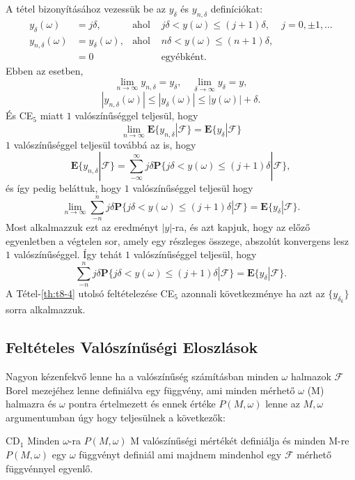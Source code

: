 \documentclass{article}
\begin{document}
A tétel bizonyításához vezessük be az $y_{\delta}$ és $y_{n,\delta}$ definíciókat:
\begin{align*}
    y_{\delta}(\omega) &= j \delta, & \text{ahol } & j \delta < y(\omega) \le (j+1)\delta, & j=0,\pm 1, \ldots \\
    y_{n,\delta}(\omega) &= y_{\delta}(\omega), & \text{ahol } & n \delta < y(\omega) \le (n+1)\delta, \\
	&= 0 && \text{egyébként}.
\end{align*}
Ebben az esetben,
\[
\lim\limits_{n \to \infty } y_{n,\delta} = y_{\delta}, \quad \lim\limits_{\delta \to \infty } y_{\delta} = y,
\]
\[
	|y_{n,\delta}(\omega)| \le |y_{\delta}(\omega)| \le |y(\omega)| + \delta .
\]
És CE$_5$ miatt $1$ valószínűséggel teljesül, hogy 
\[
 \lim\limits_{n \to \infty } \mathrm{\textbf{E}}\{y_{n,\delta} | \mathscr{F}\} = \mathrm{\textbf{E}}\{y_{\delta} | \mathscr{F}\}
\]
$1$ valószínűséggel teljesül továbbá az is, hogy 
\[
	\mathrm{\textbf{E}}\{y_{n,\delta} | \mathscr{F}\} = \sum_{-\infty}^{\infty} j \delta \mathrm{\textbf{P}} \{ j \delta < y(\omega) \le (j+1) \delta | \mathscr{F}\},
\]
és így pedig beláttuk, hogy $1$ valószínűséggel teljesül hogy
\[
 \lim\limits_{n \to \infty } \sum_{-n}^{n} j \delta \mathrm{\textbf{P}} \{ j \delta < y(\omega) \le (j+1) \delta | \mathscr{F}\} = \mathrm{\textbf{E}}\{y_{\delta} | \mathscr{F}\}.
\]
Most alkalmazzuk ezt az eredményt $|y|$-ra, és azt kapjuk, hogy az előző egyenletben a végtelen sor, amely egy részleges összege, abszolút konvergens lesz $1$ valószínűséggel. Így tehát $1$ valószínűséggel teljesül, hogy
\[
  \sum_{-n}^{n} j \delta \mathrm{\textbf{P}} \{ j \delta < y(\omega) \le (j+1) \delta | \mathscr{F}\} = \mathrm{\textbf{E}}\{y_{\delta} | \mathscr{F}\}.
\]
A Tétel-\ref{th:t8-4} utolsó feltételezése CE$_5$ azonnali következménye ha azt az $\{y_{\delta_k}\}$ sorra alkalmazzuk.

\subsection{Feltételes Valószínűségi Eloszlások}

Nagyon kézenfekvő lenne ha a valószínűség számításban minden $\omega$ halmazok $\mathscr{F}$ Borel mezejéhez lenne definiálva egy függvény, ami minden mérhető $\omega$ (M) halmazra és $\omega$ pontra értelmezett és ennek értéke $P(M,\omega)$ lenne az $M,\omega$ argumentumban úgy hogy teljesülnek a következők:

CD$_1$ Minden $\omega$-ra $P(M,\omega)$ M valószínűségi mértékét definiálja és minden M-re $P(M,\omega)$ egy $\omega$ függvényt definiál ami majdnem mindenhol egy $\mathscr{F}$ mérhető függvénnyel egyenlő. 
\end{document}

